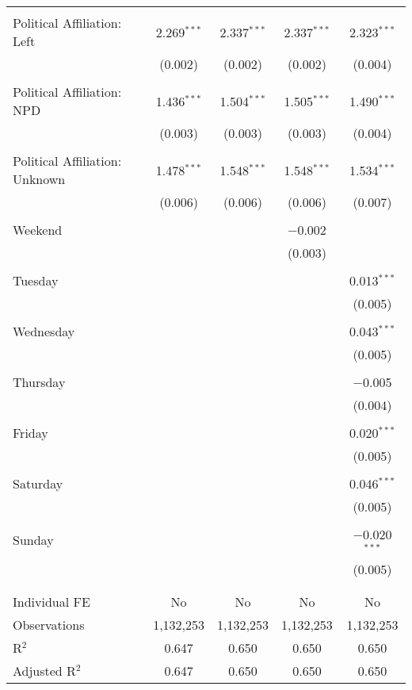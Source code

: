 \documentclass[
]{article}
\begin{document}
\begin{table}[!htbp]
{\begin{tabular}{@{\extracolsep{5pt}}lcccc}
  & & & & \\ 
 Political Affiliation: Left & 2.269$^{***}$ & 2.337$^{***}$ & 2.337$^{***}$ & 2.323$^{***}$ \\ 
  & (0.002) & (0.002) & (0.002) & (0.004) \\ 
  & & & & \\ 
 Political Affiliation: NPD & 1.436$^{***}$ & 1.504$^{***}$ & 1.505$^{***}$ & 1.490$^{***}$ \\ 
  & (0.003) & (0.003) & (0.003) & (0.004) \\ 
  & & & & \\ 
 Political Affiliation: Unknown & 1.478$^{***}$ & 1.548$^{***}$ & 1.548$^{***}$ & 1.534$^{***}$ \\ 
  & (0.006) & (0.006) & (0.006) & (0.007) \\ 
  & & & & \\ 
 Weekend &  &  & $-$0.002 &  \\ 
  &  &  & (0.003) &  \\ 
  & & & & \\ 
 Tuesday &  &  &  & 0.013$^{***}$ \\ 
  &  &  &  & (0.005) \\ 
  & & & & \\ 
 Wednesday &  &  &  & 0.043$^{***}$ \\ 
  &  &  &  & (0.005) \\ 
  & & & & \\ 
 Thursday &  &  &  & $-$0.005 \\ 
  &  &  &  & (0.004) \\ 
  & & & & \\ 
 Friday &  &  &  & 0.020$^{***}$ \\ 
  &  &  &  & (0.005) \\ 
  & & & & \\ 
 Saturday &  &  &  & 0.046$^{***}$ \\ 
  &  &  &  & (0.005) \\ 
  & & & & \\ 
 Sunday &  &  &  & $-$0.020$^{***}$ \\ 
  &  &  &  & (0.005) \\ 
  & & & & \\ 
\hline \\[-1.8ex] 
Individual FE & No & No & No & No \\ 
Observations & 1,132,253 & 1,132,253 & 1,132,253 & 1,132,253 \\ 
R$^{2}$ & 0.647 & 0.650 & 0.650 & 0.650 \\ 
Adjusted R$^{2}$ & 0.647 & 0.650 & 0.650 & 0.650 \\ 

\end{tabular}}
\end{table}
\end{document}
